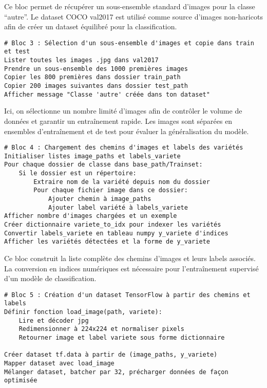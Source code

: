 Ce bloc permet de récupérer un sous-ensemble standard d'images pour la classe ``autre''. Le dataset COCO val2017 est utilisé comme source d'images non-haricots afin de créer un dataset équilibré pour la classification.

\begin{verbatim}
# Bloc 3 : Sélection d'un sous-ensemble d'images et copie dans train et test
Lister toutes les images .jpg dans val2017
Prendre un sous-ensemble des 1000 premières images
Copier les 800 premières dans dossier train_path
Copier 200 images suivantes dans dossier test_path
Afficher message "Classe 'autre' créée dans ton dataset"
\end{verbatim}

Ici, on sélectionne un nombre limité d’images afin de contrôler le volume de données et garantir un entraînement rapide. Les images sont séparées en ensembles d'entraînement et de test pour évaluer la généralisation du modèle.

\begin{verbatim}
# Bloc 4 : Chargement des chemins d'images et labels des variétés
Initialiser listes image_paths et labels_variete
Pour chaque dossier de classe dans base_path/Trainset:
    Si le dossier est un répertoire:
        Extraire nom de la variété depuis nom du dossier
        Pour chaque fichier image dans ce dossier:
            Ajouter chemin à image_paths
            Ajouter label variété à labels_variete
Afficher nombre d'images chargées et un exemple
Créer dictionnaire variete_to_idx pour indexer les variétés
Convertir labels_variete en tableau numpy y_variete d'indices
Afficher les variétés détectées et la forme de y_variete
\end{verbatim}

Ce bloc construit la liste complète des chemins d'images et leurs labels associés. La conversion en indices numériques est nécessaire pour l'entraînement supervisé d'un modèle de classification.

\begin{verbatim}
# Bloc 5 : Création d'un dataset TensorFlow à partir des chemins et labels
Définir fonction load_image(path, variete):
    Lire et décoder jpg
    Redimensionner à 224x224 et normaliser pixels
    Retourner image et label variete sous forme dictionnaire

Créer dataset tf.data à partir de (image_paths, y_variete)
Mapper dataset avec load_image
Mélanger dataset, batcher par 32, précharger données de façon optimisée
\end{verbatim}

